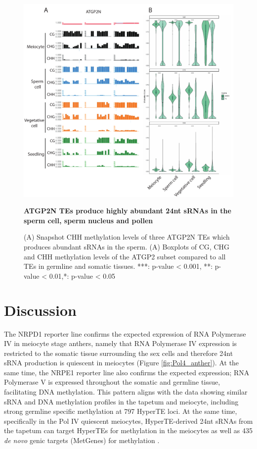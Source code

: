 \begin{figure}[htbp!] 
\centering    
    \includegraphics[width=1\textwidth]{Chapter2/Figs/Figure14_TE_methylation.pdf}
\caption{\textbf{ATGP2N TEs produce highly abundant 24nt sRNAs in the sperm cell, sperm nucleus and pollen}}
\label{fig:TE_methylation}
\captionsetup{font=small}
    \caption*{(A) Snapshot CHH methylation levels of three ATGP2N TEs which produces abundant sRNAs in the sperm. (A) Boxplots of CG, CHG and CHH methylation levels of the ATGP2 subset compared to all TEs in germline and somatic tissues. ***: p-value < 0.001, **: p-value < 0.01,*: p-value < 0.05}
\end{figure}

\clearpage

\section{Discussion}

The NRPD1 reporter line confirms the expected expression of RNA Polymerase IV in meiocyte stage anthers, namely that RNA Polymerase IV expression is restricted to the somatic tissue surrounding the sex cells and therefore 24nt sRNA production is quiescent in meiocytes (Figure \ref{fig:Pol4_anther}). At the same time, the NRPE1 reporter line also confirms the expected expression; RNA Polymerase V is expressed throughout the somatic and germline tissue, facilitating DNA methylation. This pattern aligns with the data showing similar sRNA and DNA methylation profiles in the tapetum and meiocyte, including strong germline specific methylation at 797 HyperTE loci. At the same time, specifically in the Pol IV quiescent meiocytes, HyperTE-derived 24nt sRNAs from the tapetum can target HyperTEs for methylation in the meiocytes as well as 435 \textit{de novo} genic targets (MetGenes) for methylation \citep{RN187,RN199}. 


